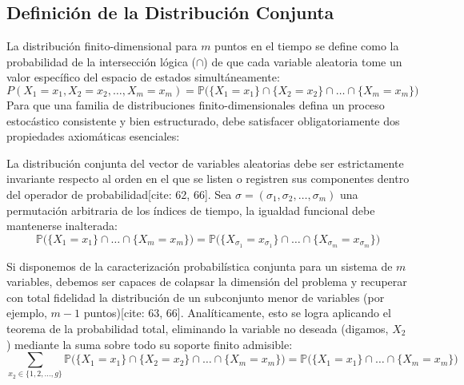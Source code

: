 \subsection{Definición de la Distribución Conjunta}
La distribución finito-dimensional para $m$ puntos en el tiempo se define como la probabilidad de la intersección lógica ($\cap$) de que cada variable aleatoria tome un valor específico del espacio de estados simultáneamente:
\begin{equation}
    P(X_1 = x_1, X_2 = x_2, \dots, X_m = x_m) = \mathbb{P}\big( \{X_1 = x_1\} \cap \{X_2 = x_2\} \cap \dots \cap \{X_m = x_m\} \big)
\end{equation}
\noindent
Para que una familia de distribuciones finito-dimensionales defina un proceso estocástico consistente y bien estructurado, debe satisfacer obligatoriamente dos propiedades axiomáticas esenciales:

\begin{prop}
La distribución conjunta del vector de variables aleatorias debe ser estrictamente invariante respecto al orden en el que se listen o registren sus componentes dentro del operador de probabilidad[cite: 62, 66]. Sea $\sigma = (\sigma_1, \sigma_2, \dots, \sigma_m)$ una permutación arbitraria de los índices de tiempo, la igualdad funcional debe mantenerse inalterada:
\begin{equation*}
    \mathbb{P}\big( \{X_1 = x_1\} \cap \dots \cap \{X_m = x_m\} \big) = \mathbb{P}\big( \{X_{\sigma_1} = x_{\sigma_1}\} \cap \dots \cap \{X_{\sigma_m} = x_{\sigma_m}\} \big)
\end{equation*}
\end{prop}

\begin{prop}
Si disponemos de la caracterización probabilística conjunta para un sistema de $m$ variables, debemos ser capaces de colapsar la dimensión del problema y recuperar con total fidelidad la distribución de un subconjunto menor de variables (por ejemplo, $m-1$ puntos)[cite: 63, 66]. Analíticamente, esto se logra aplicando el teorema de la probabilidad total, eliminando la variable no deseada (digamos, $X_2$) mediante la suma sobre todo su soporte finito admisible:
\begin{equation*}
    \sum_{x_2 \in \{1, 2, \dots, g\}} \mathbb{P}\big( \{X_1 = x_1\} \cap \{X_2 = x_2\} \cap \dots \cap \{X_m = x_m\} \big) = \mathbb{P}\big( \{X_1 = x_1\} \cap \dots \cap \{X_m = x_m\} \big)
\end{equation*}
\end{prop}

